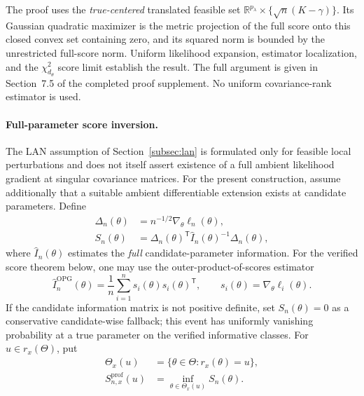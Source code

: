 The proof uses the \emph{true-centered} translated feasible set
$\mathbb R^{p_\lambda}\times\{\sqrt n(K-\gamma)\}$.
Its Gaussian quadratic maximizer is the metric projection of the
full score onto this closed convex set containing zero, and its
squared norm is bounded by the unrestricted full-score norm.
Uniform likelihood expansion, estimator localization, and the
$\chi^2_{d_\theta}$ score limit establish the result.
The full argument is given in Section~7.5 of the completed proof
supplement. No uniform covariance-rank estimator is used.

\paragraph{Full-parameter score inversion.}
The LAN assumption of Section~\ref{subsec:lan} is formulated only
for feasible local perturbations and does not itself assert existence
of a full ambient likelihood gradient at singular covariance matrices.
For the present construction, assume additionally that a suitable
ambient differentiable extension exists at candidate parameters.
Define
\begin{equation}\label{eq:sec8-score-stat}
\begin{aligned}
\Delta_n(\theta)&=n^{-1/2}\nabla_\theta\ell_n(\theta),\\
S_n(\theta)&=\Delta_n(\theta)^{\mathsf T}
\widehat I_n(\theta)^{-1}\Delta_n(\theta),
\end{aligned}
\end{equation}
where $\widehat I_n(\theta)$ estimates the \emph{full}
candidate-parameter information. For the verified score theorem below,
one may use the outer-product-of-scores estimator
\begin{equation}\label{eq:sec8-opg}
\widehat I_n^{\mathrm{OPG}}(\theta)
=\frac1n\sum_{i=1}^n s_i(\theta)s_i(\theta)^{\mathsf T},
\qquad s_i(\theta)=\nabla_\theta\ell_i(\theta).
\end{equation}
If the candidate information matrix is not positive definite,
set $S_n(\theta)=0$ as a conservative candidate-wise fallback;
this event has uniformly vanishing probability at a true parameter
on the verified informative classes.
For $u\in r_x(\Theta)$, put
\begin{equation}\label{eq:sec8-profile-score}
\begin{aligned}
\Theta_x(u)&=\{\theta\in\Theta:r_x(\theta)=u\},\\
S_{n,x}^{\mathrm{prof}}(u)&=
\inf_{\theta\in\Theta_x(u)}S_n(\theta).
\end{aligned}
\end{equation}
